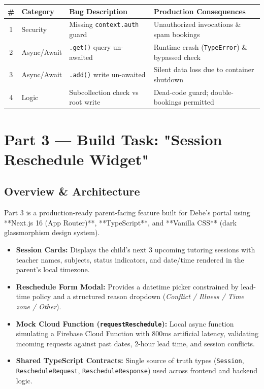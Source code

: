 \documentclass[11pt, a4paper]{article}
\begin{document}
\begin{table}[h!]
\centering
\begin{tabular}{@{}clll@{}}
\toprule
\textbf{\#} & \textbf{Category} & \textbf{Bug Description} & \textbf{Production Consequences} \\
\midrule
1 & Security    & Missing \texttt{context.auth} guard        & Unauthorized invocations \& spam bookings \\
2 & Async/Await & \texttt{.get()} query un-awaited          & Runtime crash (\texttt{TypeError}) \& bypassed check \\
3 & Async/Await & \texttt{.add()} write un-awaited          & Silent data loss due to container shutdown \\
4 & Logic       & Subcollection check vs root write & Dead-code guard; double-bookings permitted \\
\bottomrule
\end{tabular}
\end{table}

\newpage

\section{Part 3 --- Build Task: "Session Reschedule Widget"}

\subsection{Overview \& Architecture}

Part 3 is a production-ready parent-facing feature built for Debe's portal using **Next.js 16 (App Router)**, **TypeScript**, and **Vanilla CSS** (dark glassmorphism design system).

\begin{itemize}[nosep]
  \item \textbf{Session Cards:} Displays the child's next 3 upcoming tutoring sessions with teacher names, subjects, status indicators, and date/time rendered in the parent's local timezone.
  \item \textbf{Reschedule Form Modal:} Provides a datetime picker constrained by lead-time policy and a structured reason dropdown (\textit{Conflict / Illness / Time zone / Other}).
  \item \textbf{Mock Cloud Function (\texttt{requestReschedule}):} Local async function simulating a Firebase Cloud Function with 800ms artificial latency, validating incoming requests against past dates, 2-hour lead time, and session conflicts.
  \item \textbf{Shared TypeScript Contracts:} Single source of truth types (\texttt{Session}, \texttt{RescheduleRequest}, \texttt{RescheduleResponse}) used across frontend and backend logic.
\end{itemize}
\end{document}
